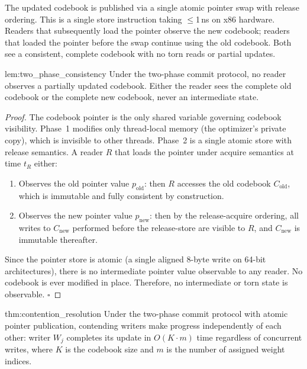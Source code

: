 The updated codebook is published via a single atomic pointer swap with release ordering. This is a single store instruction taking $\leq$1\,ns on x86 hardware. Readers that subsequently load the pointer observe the new codebook; readers that loaded the pointer before the swap continue using the old codebook. Both see a consistent, complete codebook with no torn reads or partial updates.

\begin{mylemma}{lem:two_phase_consistency}
Under the two-phase commit protocol, no reader observes a partially updated codebook. Either the reader sees the complete old codebook or the complete new codebook, never an intermediate state.
\end{mylemma}

\begin{proof}
The codebook pointer is the only shared variable governing codebook visibility. Phase~1 modifies only thread-local memory (the optimizer's private copy), which is invisible to other threads. Phase~2 is a single atomic store with release semantics. A reader $R$ that loads the pointer under acquire semantics at time $t_R$ either:

\begin{enumerate}
    \item Observes the old pointer value $p_{\text{old}}$: then $R$ accesses the old codebook $C_{\text{old}}$, which is immutable and fully consistent by construction.
    \item Observes the new pointer value $p_{\text{new}}$: then by the release-acquire ordering, all writes to $C_{\text{new}}$ performed before the release-store are visible to $R$, and $C_{\text{new}}$ is immutable thereafter.
\end{enumerate}

Since the pointer store is atomic (a single aligned 8-byte write on 64-bit architectures), there is no intermediate pointer value observable to any reader. No codebook is ever modified in place. Therefore, no intermediate or torn state is observable. $\square$
\end{proof}

\begin{mythm}{thm:contention_resolution}
Under the two-phase commit protocol with atomic pointer publication, contending writers make progress independently of each other: writer $W_j$ completes its update in $O(K \cdot m)$ time regardless of concurrent writes, where $K$ is the codebook size and $m$ is the number of assigned weight indices.
\end{mythm}

